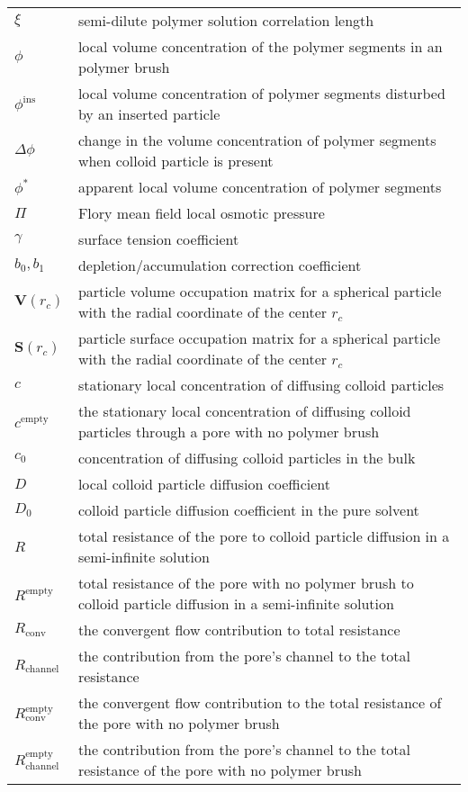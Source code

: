 \documentclass[10pt, a4paper]{article}
\begin{document}
\begin{tabularx}{\linewidth}{l l}
$\xi$ & semi-dilute polymer solution correlation length \\
$\phi$ & local volume concentration of the polymer segments in an polymer brush\\
$\phi^{\textrm{ins}}$ & local volume concentration of polymer segments disturbed by an inserted particle\\
$\Delta \phi$ & change in the volume concentration of polymer segments when colloid particle is present \\
$\phi^{\ast}$ & apparent local volume concentration of polymer segments \\
$\Pi$ & Flory mean field local osmotic pressure \\
$\gamma$ & surface tension coefficient \\
$b_0, b_1$ & depletion/accumulation correction coefficient \\
$\textbf{V}(r_{c})$ & particle volume occupation matrix for a spherical particle with the radial coordinate of the center $r_{c}$ \\
$\textbf{S}(r_{c})$ & particle surface occupation matrix for a spherical particle with the radial coordinate of the center $r_{c}$ \\
$c$ & stationary local concentration of diffusing colloid particles \\
$c^{\textrm{empty}}$ & the stationary local concentration of diffusing colloid particles through a pore with no polymer brush \\
$c_0$ & concentration of diffusing colloid particles in the bulk \\
$D$ & local colloid particle diffusion coefficient \\
$D_0$ & colloid particle diffusion coefficient in the pure solvent \\
$R$ & total resistance of the pore to colloid particle diffusion in a semi-infinite solution \\
$R^{\textrm{empty}}$ & total resistance of the pore with no polymer brush to colloid particle diffusion in a semi-infinite solution \\
$R_{\textrm{conv}}$ & the convergent flow contribution to total resistance \\
$R_{\textrm{channel}}$ & the contribution from the pore's channel to the total resistance \\
$R^{\textrm{empty}}_{\textrm{conv}}$ & the convergent flow contribution to the total resistance of the pore with no polymer brush \\
$R^{\textrm{empty}}_{\textrm{channel}}$ & the contribution from the pore's channel to the total resistance of the pore with no polymer brush \\

\end{tabularx}
\end{document}

